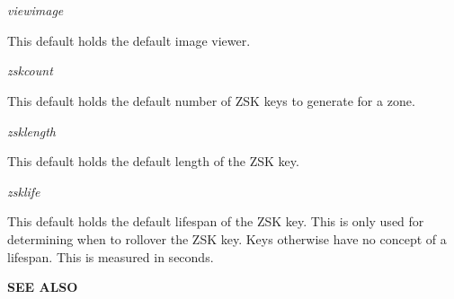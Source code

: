 \begin{description}
\item {\it viewimage}\verb" "

This default holds the default image viewer.

\item {\it zskcount}\verb" "

This default holds the default number of ZSK keys to generate for a zone.

\item {\it zsklength}\verb" "

This default holds the default length of the ZSK key.

\item {\it zsklife}\verb" "

This default holds the default lifespan of the ZSK key.  This is only used
for determining when to rollover the ZSK key.  Keys otherwise have no
concept of a lifespan.  This is measured in seconds.

\end{description}

{\bf SEE ALSO}

